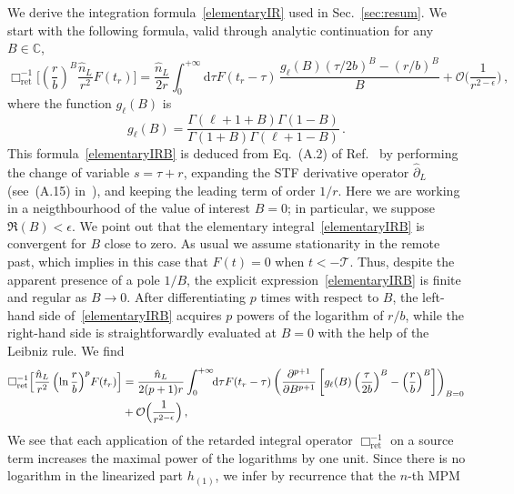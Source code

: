 \documentclass[prd,preprint,superscriptaddress,tightenlines,nofootinbib,
  eqsecnum,showpacs]{revtex4}
\newcommand{\ud}{\mathrm{d}}
\begin{document}
We derive the integration formula~\eqref{elementaryIR} used in
Sec.~\ref{sec:resum}. We start with the following formula, valid
through analytic continuation for any $B\in\mathbb{C}$,
%
\begin{equation}\label{elementaryIRB}
 \Box^{-1}_\mathrm{ret} \biggl[\left(\frac{r}{b}\right)^B
   \frac{\hat{n}_L}{r^{2}} F(t_r)\biggr] = \frac{\hat{n}_L}{2r}
 \int_0^{+\infty}\!\!  \ud\tau F(t_r-\tau) \,\frac{g_\ell(B)
   (\tau/2b)^B- (r/b)^B}{B} + \mathcal{O}\Big(
 \frac{1}{r^{2-\epsilon}}\Big) \,,
\end{equation}
%
where the function $g_\ell(B)$ is
%
\begin{equation} \label{gell}
g_\ell(B) =
\frac{\Gamma(\ell+1+B)\Gamma(1-B)}{\Gamma(1+B)\Gamma(\ell+1-B)} \,.
\end{equation}
%
This formula~\eqref{elementaryIRB} is deduced from Eq.~(A.2) of
Ref.~\cite{B98quad} by performing the change of variable $s=\tau + r$,
expanding the STF derivative operator $\hat{\partial}_L$ (see~(A.15)
in~\cite{B98quad}), and keeping the leading term of order $1/r$. Here
we are working in a neigthbourhood of the value of interest $B=0$; in
particular, we suppose $\Re(B) < \epsilon$. We point out that the
elementary integral~\eqref{elementaryIRB} is convergent for $B$ close
to zero. As usual we assume stationarity in the remote past, which
implies in this case that $F(t) = 0$ when $t< -\mathcal{T}$. Thus,
despite the apparent presence of a pole $1/B$, the explicit
expression~\eqref{elementaryIRB} is finite and regular as $B\to
0$. After differentiating $p$ times with respect to $B$, the left-hand
side of~\eqref{elementaryIRB} acquires $p$ powers of the logarithm of
$r/b$, while the right-hand side is straightforwardly evaluated at
$B=0$ with the help of the Leibniz rule. We find
%
\begin{align} \label{elementaryIRB2}
 \Box^{-1}_\mathrm{ret} \Bigl[ \frac{\hat{n}_L}{r^2}
   \left(\ln\frac{r}{b}\right)^p \!F(t_r)\Bigr] &=
 \frac{\hat{n}_L}{2(p+1)r} \int_{0}^{+\infty} \!\! \ud\tau F(t_r-\tau)
 \left(\frac{\partial^{p+1} }{\partial B^{p+1}}\left[g_\ell(B)
   \left(\frac{\tau}{2b}\right)^B - \left(\frac{r}{b}\right)^B
   \right]\right)_{B=0} \nonumber\\ &+ \mathcal{O}\Big(
 \frac{1}{r^{2-\epsilon}}\Big) \,,
\end{align}
%
We see that each application of the retarded integral operator
$\Box^{-1}_\mathrm{ret}$ on a source term increases the maximal power
of the logarithms by one unit. Since there is no logarithm in the
linearized part $h_{(1)}$, we infer by recurrence that the $n$-th MPM
\end{document}
